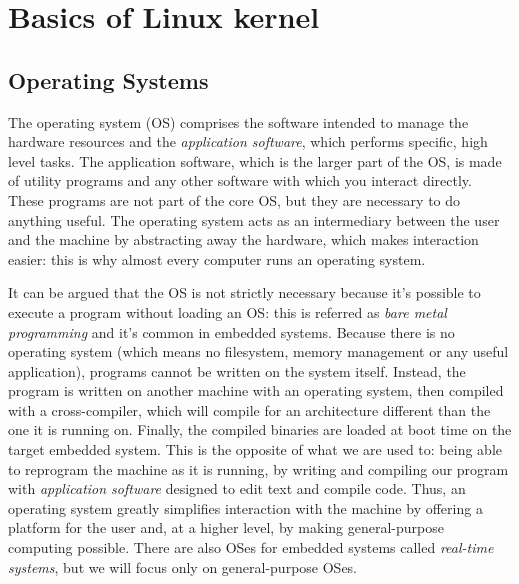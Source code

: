 \documentclass[10pt]{book}
\begin{document}
\chapter{Basics of Linux kernel}
\label{ch:introduction}

\section{Operating Systems}
\label{sec:os}
The operating system (OS) comprises the software intended to manage the hardware resources and the \textit{application software}, which performs specific, high level tasks. The application software, which is the larger part of the OS, is made of utility programs and any other software with which you interact directly. These programs are not part of the core OS, but they are necessary to do anything useful. The operating system acts as an intermediary between the user and the machine by abstracting away the hardware, which makes interaction easier: this is why almost every computer runs an operating system.

It can be argued that the OS is not strictly necessary because it's possible to execute a program without loading an OS: this is referred as \textit{bare metal programming} and it's common in embedded systems. Because there is no operating system (which means no filesystem, memory management or any useful application), programs cannot be written on the system itself. Instead, the program is written on another machine with an operating system, then compiled with a cross-compiler, which will compile for an architecture different than the one it is running on. Finally, the compiled binaries are loaded at boot time on the target embedded system. This is the opposite of what we are used to: being able to reprogram the machine as it is running, by writing and compiling our program with \textit{application software} designed to edit text and compile code. Thus, an operating system greatly simplifies interaction with the machine by offering a platform for the user and, at a higher level, by making general-purpose computing possible. There are also OSes for embedded systems called \textit{real-time systems}, but we will focus only on general-purpose OSes. 
\end{document}
